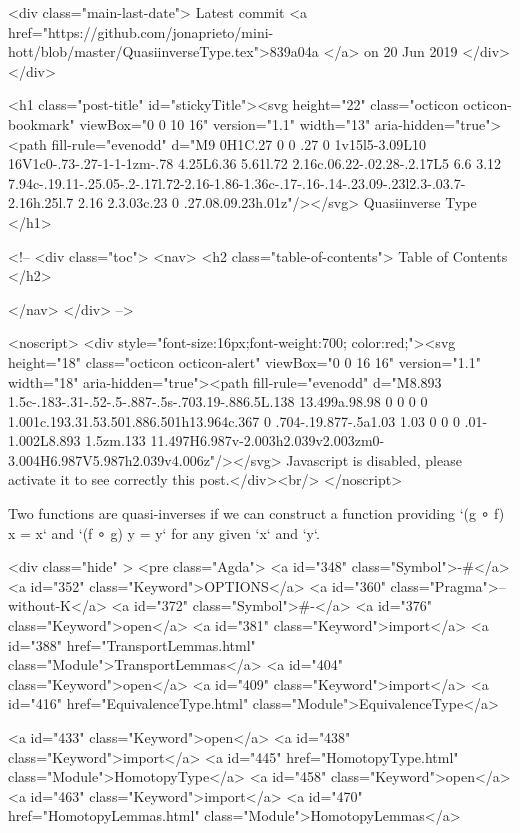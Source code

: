     <div class="main-last-date">
      Latest commit <a href="https://github.com/jonaprieto/mini-hott/blob/master/QuasiinverseType.tex">839a04a </a> on  20 Jun 2019
    </div>
  </div>
  
  <h1 class="post-title" id="stickyTitle"><svg height="22" class="octicon octicon-bookmark" viewBox="0 0 10 16" version="1.1" width="13" aria-hidden="true"><path fill-rule="evenodd" d="M9 0H1C.27 0 0 .27 0 1v15l5-3.09L10 16V1c0-.73-.27-1-1-1zm-.78 4.25L6.36 5.61l.72 2.16c.06.22-.02.28-.2.17L5 6.6 3.12 7.94c-.19.11-.25.05-.2-.17l.72-2.16-1.86-1.36c-.17-.16-.14-.23.09-.23l2.3-.03.7-2.16h.25l.7 2.16 2.3.03c.23 0 .27.08.09.23h.01z"/></svg> Quasiinverse Type
  </h1>

  <!-- 
  <div class="toc">
    <nav>
    <h2 class="table-of-contents"> Table of Contents </h2>
      

    </nav>
  </div>
   -->

  <noscript>
  <div style="font-size:16px;font-weight:700; color:red;"><svg height="18" class="octicon octicon-alert" viewBox="0 0 16 16" version="1.1" width="18" aria-hidden="true"><path fill-rule="evenodd" d="M8.893 1.5c-.183-.31-.52-.5-.887-.5s-.703.19-.886.5L.138 13.499a.98.98 0 0 0 0 1.001c.193.31.53.501.886.501h13.964c.367 0 .704-.19.877-.5a1.03 1.03 0 0 0 .01-1.002L8.893 1.5zm.133 11.497H6.987v-2.003h2.039v2.003zm0-3.004H6.987V5.987h2.039v4.006z"/></svg> Javascript is disabled, please activate it to see correctly this post.</div><br/>
  </noscript>

  Two functions are quasi-inverses if we can construct a function providing
`(g ∘ f) x = x` and `(f ∘ g) y = y` for any given `x` and `y`.

<div class="hide" >
<pre class="Agda">
<a id="348" class="Symbol">{-#</a> <a id="352" class="Keyword">OPTIONS</a> <a id="360" class="Pragma">--without-K</a> <a id="372" class="Symbol">#-}</a>
<a id="376" class="Keyword">open</a> <a id="381" class="Keyword">import</a> <a id="388" href="TransportLemmas.html" class="Module">TransportLemmas</a>
<a id="404" class="Keyword">open</a> <a id="409" class="Keyword">import</a> <a id="416" href="EquivalenceType.html" class="Module">EquivalenceType</a>

<a id="433" class="Keyword">open</a> <a id="438" class="Keyword">import</a> <a id="445" href="HomotopyType.html" class="Module">HomotopyType</a>
<a id="458" class="Keyword">open</a> <a id="463" class="Keyword">import</a> <a id="470" href="HomotopyLemmas.html" class="Module">HomotopyLemmas</a>

